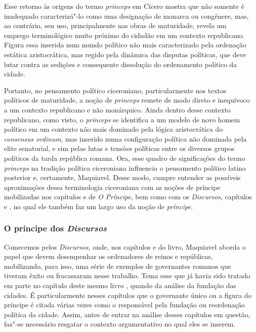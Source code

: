 Esse retorno às origens do termo \emph{princeps} em Cícero mostra que
não somente é inadequado caracterizá"-lo como uma designação de monarca
ou congênere, mas, ao contrário, seu uso, principalmente nas obras de
maturidade, revela um emprego terminológico muito próximo do cidadão em
um contexto republicano. Figura essa inserida num mundo político não
mais caracterizado pela ordenação estática aristocrática, mas regido
pela dinâmica das disputas políticas, que deve lutar contra as sedições
e consequente dissolução do ordenamento político da cidade.

Portanto, no pensamento político ciceroniano, particularmente nos textos
políticos de maturidade, a noção de \emph{princeps} remete de modo
direto e inequívoco a um contexto republicano e não monárquico. Ainda
dentro desse contexto republicano, como visto, o \emph{princeps} se
identifica a um modelo de novo homem político em um contexto não mais
dominado pela lógica aristocrática do \emph{consensus ordinum}, mas
inserido numa configuração política não dominada pela elite senatorial,
e sim pelas lutas e tensões políticas entre os diversos grupos políticos
da tarda república romana. Ora, esse quadro de significações do termo
\emph{princeps} na tradição política ciceroniana influencia o pensamento
político latino posterior e, certamente, Maquiavel. Desse modo, cumpre
entender as possíveis aproximações dessa terminologia ciceroniana com as
noções de príncipe mobilizadas nos capítulos  e  de \emph{O
Príncipe}, bem como com os \emph{Discursos}, capítulos  e , no qual
ele também faz um largo uso da noção de \emph{príncipe}.

\subsubsection{O príncipe dos \emph{Discursos}}

Comecemos pelos \emph{Discursos,} onde, nos capítulos  e  do
livro, Maquiavel aborda o papel que devem desempenhar os
ordenadores de reinos e repúblicas, mobilizando, para isso, uma série de
exemplos de governantes romanos que tiveram êxito ou fracassaram nesse
trabalho. Tema esse que já havia sido tratado em parte no capítulo 
deste mesmo livro , quando da análise da fundação das cidades. É
particularmente nesses capítulos que o governante único ou a figura do
príncipe é citada várias vezes como o responsável pela fundação ou
reordenação política da cidade. Assim, antes de entrar na análise desses
capítulos em questão, faz"-se necessário resgatar o contexto
argumentativo no qual eles se inserem.

